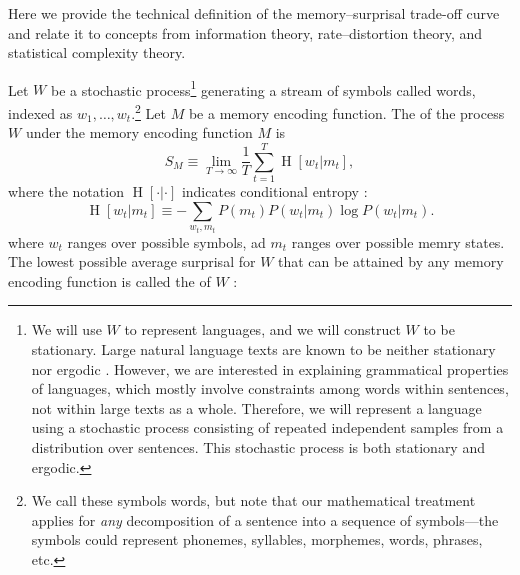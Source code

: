 Here we provide the technical definition of the memory--surprisal trade-off curve and relate it to concepts from information theory, rate--distortion theory, and statistical complexity theory.

Let $W$ be a stochastic process\footnote{We will use $W$ to represent languages, and we will construct $W$ to be stationary. Large natural language texts are known to be neither stationary nor ergodic \citep{debowski}. However, we are interested in explaining grammatical properties of languages, which mostly involve constraints among words within sentences, not within large texts as a whole. Therefore, we will represent a language using a stochastic process consisting of repeated independent samples from a distribution over sentences. This stochastic process is both stationary and ergodic.} generating a stream of symbols called words, indexed as $w_1, \dots, w_t$.\footnote{We call these symbols words, but note that our mathematical treatment applies for \emph{any} decomposition of a sentence into a sequence of symbols---the symbols could represent phonemes, syllables, morphemes, words, phrases, etc.} Let $M$ be a memory encoding function. The  of the process $W$ under the memory encoding function $M$ is
\begin{equation}
    S_M \equiv \lim_{T\rightarrow\infty} \frac{1}{T} \sum_{t=1}^T \operatorname{H}[w_t | m_t],
\end{equation}
where the notation $\operatorname{H}[\cdot | \cdot]$ indicates conditional entropy \citep[][p. 17]{cover2006elements}:
\begin{equation}
    \operatorname{H}[w_t|m_t] \equiv -\sum_{w_t,m_t} P(m_t) P(w_t|m_t) \log P(w_t|m_t).
\end{equation}
where $w_t$ ranges over possible symbols, ad $m_t$ ranges over possible memry states.
The lowest possible average surprisal for $W$ that can be attained by any memory encoding function is called the  of $W$ \citep[][pp. 74--75]{cover2006elements}:

